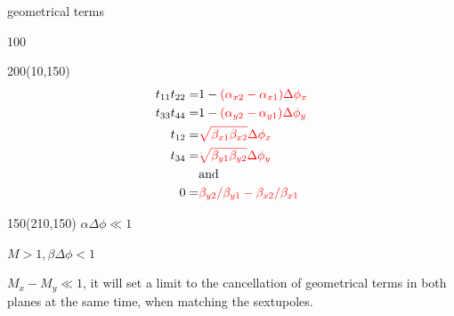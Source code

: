 \documentclass{beamer}
\begin{document}
\begin{frame}{geometrical terms}
\begin{textblock}{100}
 \end{textblock}
 \begin{textblock}{200}(10,150)
 \begin{align*}
t_{11}t_{22}=&1-{\color{red}(\alpha_{x2}-\alpha_{x1})\Delta\phi_x}\\
t_{33}t_{44}=&1-{\color{red}(\alpha_{y2}-\alpha_{y1})\Delta\phi_y}\\
t_{12} =& {\color{red}\sqrt{\beta_{x1}\beta_{x2}}\Delta\phi_x}\\
t_{34} =& {\color{red}\sqrt{\beta_{y1}\beta_{y2}}\Delta\phi_y}\\
  &\text{and}\\
  0 =& {\color{red}\beta_{y2}/\beta_{y1}-\beta_{x2}/\beta_{x1}}
\end{align*}
\end{textblock}
 \begin{textblock}{150}(210,150)
  \vspace*{0.5cm}
  $\alpha\Delta\phi\ll 1$\par
  $M>1, \beta\Delta\phi<1$\par
  $M_x-M_y\ll1$, it will set a limit to the cancellation of geometrical terms in both planes at the same time, when matching the sextupoles.\par
 \end{textblock}
\end{frame}
\end{document}
